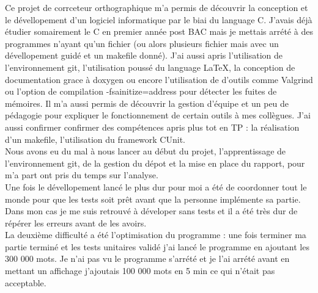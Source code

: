 Ce projet de corrceteur orthographique m'a permis de découvrir la conception et le dévellopement d'un logiciel informatique par le biai du language C.
J'avais déjà étudier somairement le C en premier année post BAC mais je mettais arrété à des programmes n'ayant qu'un fichier 
(ou alors plusieurs fichier mais avec un dévellopement guidé et un makefile donné).
J'ai aussi apris l'utilisation de l'environnement git, l'utilisation poussé du language \LaTeX, la conception de documentation grace à doxygen
ou encore l'utilisation de d'outils comme Valgrind ou l'option de compilation -fsainitize=address pour détecter les fuites de mémoires. 
Il m'a aussi permis de découvrir la gestion d'équipe et un peu de pédagogie pour expliquer le fonctionnement de certain outils à  mes collègues. 
J'ai aussi confirmer confirmer des compétences apris plus tot en TP : la réalisation d'un makefile, l'utilisation du framework CUnit.\\

Nous avons eu du mal à nous lancer au début du projet, l'apprentissage de l'environnement git, de la gestion du dépot et la mise en place du rapport, 
pour m'a part ont pris du temps sur l'analyse.\\

Une fois le dévellopement lancé le plus dur pour moi a été de coordonner tout le monde pour que les tests soit prêt avant que la personne implémente sa partie.
Dans mon cas je me suis retrouvé à déveloper sans tests et il a été très dur de répérer les erreurs avant de les avoirs.\\

La deuxième difficulté a été l'optimisation du programme : une fois terminer ma partie terminé et les tests unitaires validé 
j'ai lancé le programme en ajoutant les 300 000 mots. Je n'ai pas vu le programme s'arrété et je l'ai arrété avant en mettant 
un affichage j'ajoutais 100 000 mots en 5 min ce qui n'était pas acceptable.